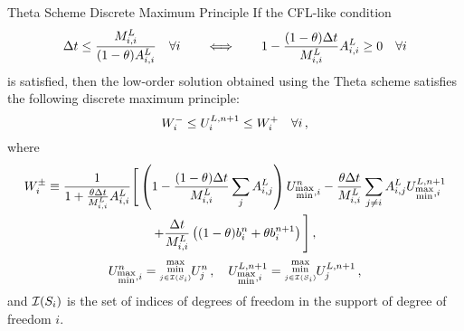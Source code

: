\begin{theorem}{Theta Scheme Discrete Maximum Principle}
If the CFL-like condition
\begin{equation}\label{eq:theta_cfl}
   \Delta t \leq \frac{M^L_{i,i}}{(1-\theta)
     A_{i,i}^L}\quad\forall i
   \qquad\Longleftrightarrow\qquad
   1 - \frac{(1-\theta)\Delta t}{M^L_{i,i}}
     A_{i,i}^L
     \geq 0\quad\forall i
\end{equation}
is satisfied, then the low-order solution obtained using the Theta scheme
satisfies the following discrete maximum principle:
\begin{equation}\label{eq:theta_dmp}
  W_i^-\leq U_i^{L,n+1}\leq W_i^+
  \quad\forall i \,,
\end{equation}
where
\begin{multline}\label{eq:theta_bounds}
   W_i^\pm
   \equiv \frac{1}{1+\frac{\theta\Delta t}{M^L_{i,i}}
     A_{i,i}^L}\Bigg[\left(1
     - \frac{(1-\theta)\Delta t}{M^L_{i,i}}
       \sum\limits_jA_{i,j}^L\right)U_{\substack{\max\\\min},i}^n
     - \frac{\theta\Delta t}{M^L_{i,i}}
       \sum\limits_{j\ne i}A_{i,j}^L
       U_{\substack{\max\\\min},i}^{L,n+1}
     \\
     + \frac{\Delta t}{M^L_{i,i}}\left((1-\theta)
       b_i^n + \theta b_i^{n+1}\right)\Bigg] \,,
\end{multline}
\[
  \solutionletter_{\substack{\max\\\min},i}^n
  = \substack{\max\\\min\limits_{j\in\indicescell[\support_i]}}
    \solutionletter_j^n
  \eqc \quad
  \solutionletter_{\substack{\max\\\min},i}^{L,n+1}
  = \substack{\max\\\min\limits_{j\in\indicescell[\support_i]}}
  \solutionletter_j^{L,n+1}
  \eqc
\]
and $\indicescell[\support_i]$ is the set of indices of degrees of freedom in the
support of degree of freedom $i$.
\end{theorem}
